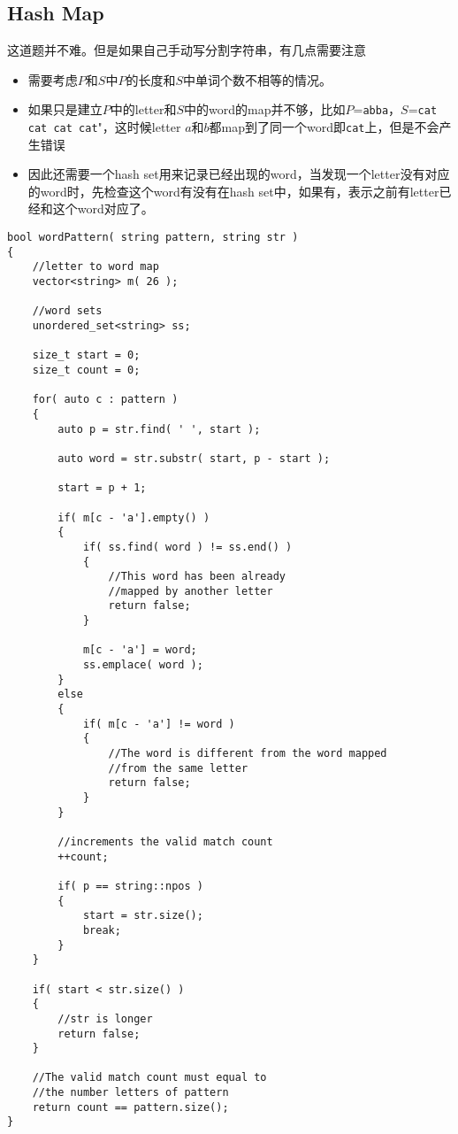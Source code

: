 \subsection{Hash Map}
这道题并不难。但是如果自己手动写分割字符串，有几点需要注意
\begin{itemize}
\item 需要考虑$P$和$S$中$P$的长度和$S$中单词个数不相等的情况。
\item 如果只是建立$P$中的letter和$S$中的word的map并不够，比如$P$=\texttt{abba}，$S$=\texttt{cat cat cat cat}"，这时候letter $a$和$b$都map到了同一个word即\texttt{cat}上，但是不会产生错误
\item 因此还需要一个hash set用来记录已经出现的word，当发现一个letter没有对应的word时，先检查这个word有没有在hash set中，如果有，表示之前有letter已经和这个word对应了。
\end{itemize}
\setcounter{lstlisting}{0}
\begin{lstlisting}[style=customc, caption={Hash Map}]
bool wordPattern( string pattern, string str )
{
    //letter to word map
    vector<string> m( 26 );

    //word sets
    unordered_set<string> ss;

    size_t start = 0;
    size_t count = 0;

    for( auto c : pattern )
    {
        auto p = str.find( ' ', start );

        auto word = str.substr( start, p - start );

        start = p + 1;

        if( m[c - 'a'].empty() )
        {
            if( ss.find( word ) != ss.end() )
            {
                //This word has been already
                //mapped by another letter
                return false;
            }

            m[c - 'a'] = word;
            ss.emplace( word );
        }
        else
        {
            if( m[c - 'a'] != word )
            {
                //The word is different from the word mapped
                //from the same letter
                return false;
            }
        }

        //increments the valid match count
        ++count;

        if( p == string::npos )
        {
            start = str.size();
            break;
        }
    }

    if( start < str.size() )
    {
        //str is longer
        return false;
    }

    //The valid match count must equal to
    //the number letters of pattern
    return count == pattern.size();
}
\end{lstlisting}

